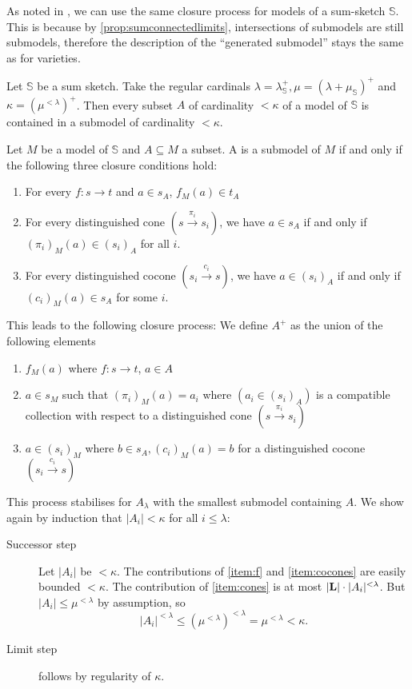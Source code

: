 As noted in \cite[\nopp~3.3.3]{MakkaiPare}, we can use the same closure process for models of a sum-sketch $\mathbb S$. This is because by \ref{prop:sumconnectedlimits}, intersections of submodels are still submodels, therefore the description of the ``generated submodel'' stays the same as for varieties.
\begin{Proposition}
Let $\mathbb S$ be a sum sketch. Take the regular cardinals $\lambda = \lambda^+_\mathbb S, \mu = (\lambda + \mu_\mathbb S)^+$ and $\kappa = (\mu^{< \lambda})^+$. Then every subset $A$ of cardinality $< \kappa$ of a model of $\mathbb S$ is contained in a submodel of cardinality $< \kappa$.
\end{Proposition}
\begin{Proof}
Let $M$ be a model of $\mathbb S$ and $A \subseteq M$ a subset. A is a submodel of $M$ if and only if the following three closure conditions hold:
\begin{enumerate}
\item\label{item:f} For every $f : s \to t$ and $a \in s_A$, $f_M(a) \in t_A$
\item\label{item:cones} For every distinguished cone $(s \xrightarrow{\pi_i} s_i)$, we have $a \in s_A$ if and only if $(\pi_i)_M(a) \in (s_i)_A$ for all $i$.
\item\label{item:cocones} For every distinguished cocone $(s_i \xrightarrow{c_i} s)$, we have $a \in (s_i)_A$ if and only if $(c_i)_M(a) \in s_A$ for some $i$.
\end{enumerate}
This leads to the following closure process: We define $A^+$ as the union of the following elements
\begin{enumerate}
\item $f_M(a)$ where $f : s \to t$, $a \in A$
\item $a \in s_M$ such that $(\pi_i)_M(a) = a_i$ where $(a_i \in (s_i)_A)$ is a compatible collection with respect to a distinguished cone $(s \xrightarrow{\pi_i} s_i)$
\item $a \in (s_i)_M$ where $b \in s_A, (c_i)_M(a) = b$ for a distinguished cocone  $(s_i \xrightarrow{c_i} s)$
\end{enumerate}
This process stabilises for $A_\lambda$ with the smallest submodel containing $A$. We show again by induction that $|A_i| < \kappa$ for all $i \leq \lambda$: 
\begin{description}
\item[Successor step] Let $|A_i|$ be $< \kappa$. The contributions of \ref{item:f} and \ref{item:cocones} are easily bounded $< \kappa$. The contribution of \ref{item:cones} is at most $|\textbf{L}|\cdot |A_i|^{< \lambda}$. But $|A_i| \leq \mu^{< \lambda}$ by assumption, so \[ |A_i|^{< \lambda} \leq \left(\mu^{< \lambda}\right)^{< \lambda} = \mu^{< \lambda} < \kappa. \]
\item[Limit step] follows by regularity of $\kappa$.
\end{description}
\end{Proof}

